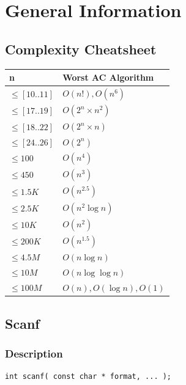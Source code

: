 \documentclass[10pt]{article}
\begin{document}
\tableofcontents

\newpage

\section{General Information}

\subsection{Complexity Cheatsheet}

\begin{center}
    \begin{tabular}{ | l | l | }
        \hline
        \textbf{n} & \textbf{Worst AC Algorithm} \\
        \hline
        $\leq [10..11]$ & $O(n!), O(n^6)$ \\
        $\leq [17..19]$ & $O(2^n \times n^2)$ \\
        $\leq [18..22]$ & $O(2^n \times n)$ \\
        $\leq [24..26]$ & $O(2^n)$ \\
        $\leq 100$ & $O(n^4)$ \\
        $\leq 450$ & $O(n^3)$ \\
        $\leq 1.5K$ & $O(n^{2.5})$ \\
        $\leq 2.5K$ & $O(n^2 \log{n})$ \\
        $\leq 10K$ & $O(n^2)$ \\
        $\leq 200K$ & $O(n^{1.5})$ \\
        $\leq 4.5M$ & $O(n \log{n})$ \\
        $\leq 10M$ & $O(n \log{\log{n}})$ \\
        $\leq 100M$ & $O(n), O(\log{n}), O(1)$ \\
        \hline
    \end{tabular}
\end{center}

\subsection{Scanf}

\subsubsection{Description}

\begin{lstlisting}
int scanf( const char * format, ... );
\end{lstlisting}
\end{document}

